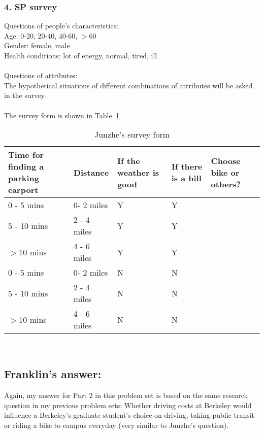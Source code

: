 \documentclass[11pt]{article}
\begin{document}
\subsubsection*{4. SP survey}
Questions of people’s characteristics:\\
Age: 0-20, 20-40, 40-60, $>$60\\
Gender: female, male\\
Health conditions: lot of energy, normal, tired, ill\\\\
Questions of attributes:\\
The hypothetical situations of different combinations of attributes will be asked in the survey.\\\\ 
The survey form is shown in Table~\ref{tb:Jsurvey}
\begin{table}[H]
	\centering
	\caption{\label{tb:Jsurvey}Junzhe's survey form}
	\vspace{5pt}
	\begin{tabular}{|m{3cm}|m{2.5cm}|m{2.5cm}|m{2.5cm}|m{2.5cm}|}      
		\hline                                                
		Time for finding a parking carport &     Distance & If the weather is good & If there is a hill &  Choose bike or others? \\\hline
		0 - 5 mins &   0- 2 miles &                      Y &                  Y &      \\\hline
		5 - 10 mins &  2 - 4 miles &                      Y &                  Y &      \\\hline                         
		$>$10 mins  &  4 - 6 miles &                      Y &                  Y &         \\\hline
		0 - 5 mins &   0- 2 miles &                      N &                  N &         \\\hline
		5 - 10 mins &  2 - 4 miles &                      N &                  N &         \\\hline
		$>$10 mins &  4 - 6 miles &                      N &                  N &           \\\hline
	\end{tabular}
\end{table}
\ \\
\subsection*{Franklin's answer:}
Again, my answer for Part 2 in this problem set is based on the same research question in my previous problem sets: Whether driving costs at Berkeley would influence a Berkeley's graduate student's choice on driving, taking public transit or riding a bike to campus everyday (very similar to Junzhe's question). 
\end{document}
